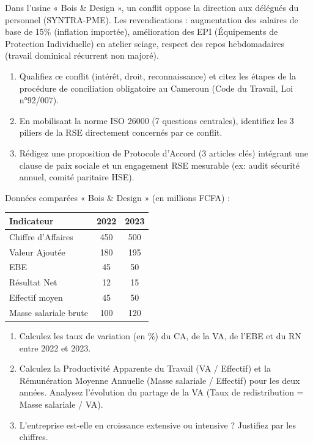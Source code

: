 \documentclass[11pt]{article}
\newcommand{\cle}[1]{{\popxbold\color{popdark}#1}}
\begin{document}
\begin{exercice}
Dans l'usine « Bois \& Design », un conflit oppose la direction aux délégués du personnel (SYNTRA-PME). Les revendications : augmentation des salaires de base de 15\% (inflation importée), amélioration des EPI (Équipements de Protection Individuelle) en atelier sciage, respect des repos hebdomadaires (travail dominical récurrent non majoré).
\begin{enumerate}
    \item Qualifiez ce conflit (intérêt, droit, reconnaissance) et citez les étapes de la procédure de conciliation obligatoire au Cameroun (Code du Travail, Loi n°92/007).
    \item En mobilisant la norme ISO 26000 (7 questions centrales), identifiez les 3 piliers de la RSE directement concernés par ce conflit.
    \item Rédigez une proposition de \cle{Protocole d'Accord} (3 articles clés) intégrant une clause de \cle{paix sociale} et un engagement RSE mesurable (ex: audit sécurité annuel, comité paritaire HSE).
\end{enumerate}
\end{exercice}

\begin{exercice}
Données comparées « Bois \& Design » (en millions FCFA) :
\begin{center}
\begin{tabular}{|l|c|c|}\hline
\textbf{Indicateur} & \textbf{2022} & \textbf{2023} \\ \hline
Chiffre d'Affaires & 450 & 500 \\
Valeur Ajoutée & 180 & 195 \\
EBE & 45 & 50 \\
Résultat Net & 12 & 15 \\
Effectif moyen & 45 & 50 \\
Masse salariale brute & 100 & 120 \\ \hline
\end{tabular}
\end{center}
\begin{enumerate}
    \item Calculez les taux de variation (en \%) du CA, de la VA, de l'EBE et du RN entre 2022 et 2023.
    \item Calculez la \cle{Productivité Apparente du Travail} (VA / Effectif) et la \cle{Rémunération Moyenne Annuelle} (Masse salariale / Effectif) pour les deux années. Analysez l'évolution du partage de la VA (Taux de redistribution = Masse salariale / VA).
    \item L'entreprise est-elle en \cle{croissance extensive} ou \cle{intensive} ? Justifiez par les chiffres.
\end{enumerate}
\end{exercice}
\end{document}
